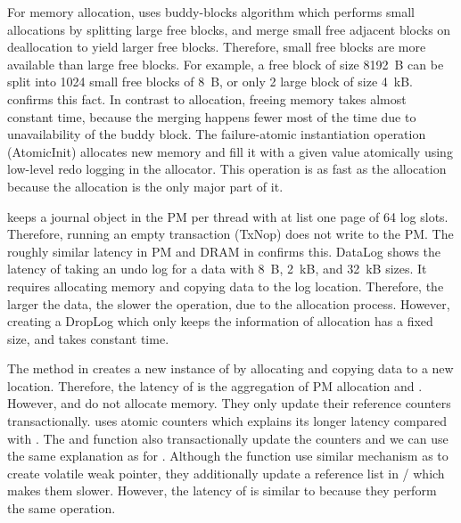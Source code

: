 For memory allocation, \This{} uses buddy-blocks algorithm which performs small allocations by splitting large free blocks, and merge small free adjacent blocks on deallocation to yield larger free blocks. Therefore, small free blocks are more available than large free blocks. For example, a free block of size 8192~B can be split into 1024 small free blocks of 8~B, or only 2 large block of size 4~kB.  confirms this fact. In contrast to allocation, freeing memory takes almost constant time, because the merging happens fewer most of the time due to unavailability of the buddy block. The failure-atomic instantiation operation (AtomicInit) allocates new memory and fill it with a given value atomically using low-level redo logging in the allocator. This operation is as fast as the allocation because the allocation is the only major part of it.

\This{} keeps a journal object in the PM per thread with at list one page of 64 log slots. Therefore, running an empty transaction (TxNop) does not write to the PM. The roughly similar latency in PM and DRAM in  confirms this. DataLog shows the latency of taking an undo log for a data with 8~B, 2~kB, and 32~kB sizes. It requires allocating memory and copying data to the log location. Therefore, the larger the data, the slower the operation, due to the allocation process. However, creating a DropLog which only keeps the information of allocation has a fixed size, and takes constant time.

The  method in  creates a new instance of  by allocating and copying data to a new location. Therefore, the latency of  is the aggregation of PM allocation and \memcpy{}. However,  and  do not allocate memory. They only update their reference counters transactionally.  uses atomic counters which explains its longer latency compared with . The  and  function also transactionally update the counters and we can use the same explanation as for . Although the  function use similar mechanism as  to create volatile weak pointer, they additionally update a reference list in / which makes them slower. However, the latency of  is similar to  because they perform the same operation.